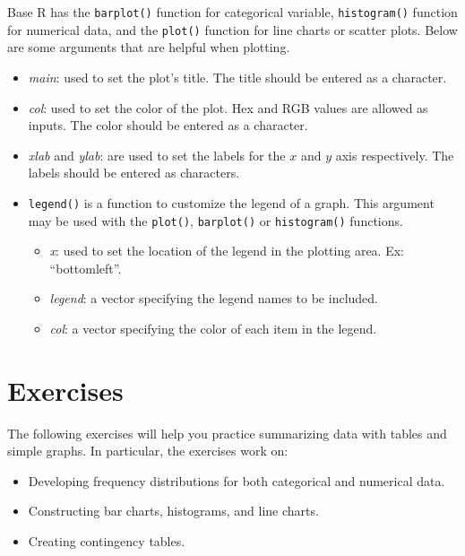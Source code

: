 \documentclass[
  letterpaper,
  DIV=11,
  numbers=noendperiod]{scrreprt}
\providecommand{\tightlist}{%
  \setlength{\itemsep}{0pt}\setlength{\parskip}{0pt}}\usepackage{longtable,booktabs,array}
\begin{document}
Base R has the \texttt{barplot()} function for categorical variable,
\texttt{histogram()} function for numerical data, and the
\texttt{plot()} function for line charts or scatter plots. Below are
some arguments that are helpful when plotting.

\begin{itemize}
\tightlist
\item
  \emph{main}: used to set the plot's title. The title should be entered
  as a character.
\item
  \emph{col}: used to set the color of the plot. Hex and RGB values are
  allowed as inputs. The color should be entered as a character.
\item
  \emph{xlab} and \emph{ylab}: are used to set the labels for the \(x\)
  and \(y\) axis respectively. The labels should be entered as
  characters.
\item
  \texttt{legend()} is a function to customize the legend of a graph.
  This argument may be used with the \texttt{plot()}, \texttt{barplot()}
  or \texttt{histogram()} functions.

  \begin{itemize}
  \tightlist
  \item
    \emph{x}: used to set the location of the legend in the plotting
    area. Ex: ``bottomleft''.
  \item
    \emph{legend}: a vector specifying the legend names to be included.
  \item
    \emph{col}: a vector specifying the color of each item in the
    legend.
  \end{itemize}
\end{itemize}

\hypertarget{exercises-1}{%
\section{Exercises}\label{exercises-1}}

The following exercises will help you practice summarizing data with
tables and simple graphs. In particular, the exercises work on:

\begin{itemize}
\item
  Developing frequency distributions for both categorical and numerical
  data.
\item
  Constructing bar charts, histograms, and line charts.
\item
  Creating contingency tables.
\end{itemize}
\end{document}
